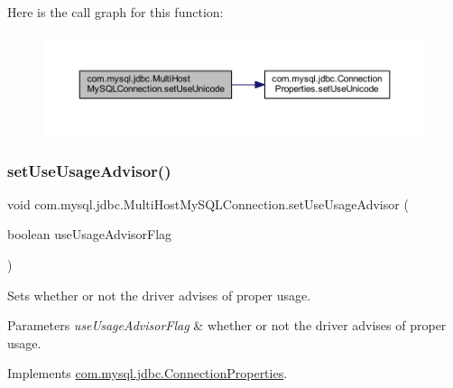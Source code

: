 Here is the call graph for this function\+:
\nopagebreak
\begin{figure}[H]
\begin{center}
\leavevmode
\includegraphics[width=350pt]{classcom_1_1mysql_1_1jdbc_1_1_multi_host_my_s_q_l_connection_afcdd021cd65ac9c824bf069c3d52a22b_cgraph}
\end{center}
\end{figure}
\mbox{\label{classcom_1_1mysql_1_1jdbc_1_1_multi_host_my_s_q_l_connection_a7a7245490c0727f69175b55bb9d7c39b}} 
\subsubsection{\texorpdfstring{set\+Use\+Usage\+Advisor()}{setUseUsageAdvisor()}}
{\footnotesize\ttfamily void com.\+mysql.\+jdbc.\+Multi\+Host\+My\+S\+Q\+L\+Connection.\+set\+Use\+Usage\+Advisor (\begin{DoxyParamCaption}\item[{boolean}]{use\+Usage\+Advisor\+Flag }\end{DoxyParamCaption})}

Sets whether or not the driver advises of proper usage.


\begin{DoxyParams}{Parameters}
{\em use\+Usage\+Advisor\+Flag} & whether or not the driver advises of proper usage. \\
\hline
\end{DoxyParams}


Implements \mbox{\hyperlink{interfacecom_1_1mysql_1_1jdbc_1_1_connection_properties_a8c6cb2052bdd1e63d3be6d2fcbd3908c}{com.\+mysql.\+jdbc.\+Connection\+Properties}}.

